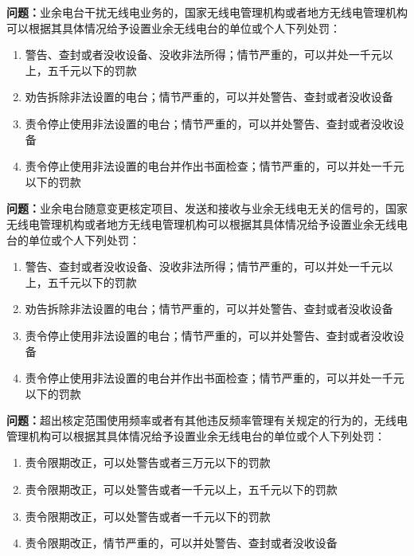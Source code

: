 \bigskip


\noindent\textbf{问题：}业余电台干扰无线电业务的，国家无线电管理机构或者地方无线电管理机构可以根据其具体情况给予设置业余无线电台的单位或个人下列处罚：
\begin{enumerate}[label=\Alph*), leftmargin=3em]
\item 警告、查封或者没收设备、没收非法所得；情节严重的，可以并处一千元以上，五千元以下的罚款
\item 劝告拆除非法设置的电台；情节严重的，可以并处警告、查封或者没收设备
\item 责令停止使用非法设置的电台；情节严重的，可以并处警告、查封或者没收设备
\item 责令停止使用非法设置的电台并作出书面检查；情节严重的，可以并处一千元以下的罚款
\end{enumerate}

\bigskip


\noindent\textbf{问题：}业余电台随意变更核定项目、发送和接收与业余无线电无关的信号的，国家无线电管理机构或者地方无线电管理机构可以根据其具体情况给予设置业余无线电台的单位或个人下列处罚：
\begin{enumerate}[label=\Alph*), leftmargin=3em]
\item 警告、查封或者没收设备、没收非法所得；情节严重的，可以并处一千元以上，五千元以下的罚款
\item 劝告拆除非法设置的电台；情节严重的，可以并处警告、查封或者没收设备
\item 责令停止使用非法设置的电台；情节严重的，可以并处警告、查封或者没收设备
\item 责令停止使用非法设置的电台并作出书面检查；情节严重的，可以并处一千元以下的罚款
\end{enumerate}

\bigskip


\noindent\textbf{问题：}超出核定范围使用频率或者有其他违反频率管理有关规定的行为的，无线电管理机构可以根据其具体情况给予设置业余无线电台的单位或个人下列处罚：
\begin{enumerate}[label=\Alph*), leftmargin=3em]
\item 责令限期改正，可以处警告或者三万元以下的罚款
\item 责令限期改正，可以处警告或者一千元以上，五千元以下的罚款
\item 责令限期改正，可以处警告或者一千元以下的罚款
\item 责令限期改正，情节严重的，可以并处警告、查封或者没收设备
\end{enumerate}

\bigskip


